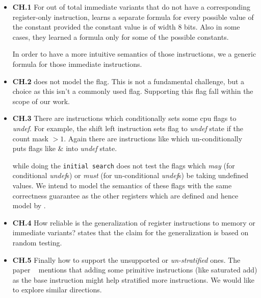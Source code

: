 \begin{itemize}
        
    \item 
    \textbf{CH.1} For \ImmUg{} out of total \ImmTotal{} immediate variants that 
    do not have a corresponding register-only instruction, 
    \Strata  learns a separate formula
    for every possible value of the constant provided the constant value is of
    width 8 bits. Also in some cases, they learned a formula only for some of
    the possible constants.
    
    In order to have a more intuitive semantics of those instructions, we a generic formula for those  immediate instructions.

    \item \textbf{CH.2} \Strata does not model the  flag. This is not a
    fundamental challenge, but a choice as this isn't a commonly used flag.
    Supporting this flag fall within the scope of our work.
      
    \item \textbf{CH.3} There are instructions which conditionally sets some
    cpu flags to \emph{undef}. For example, the shift left instruction
     sets flag  to \emph{undef} state if the
    count mask $>1$.  Again there are instructions like  which un-conditionally puts flags like  \&  into
      \emph{undef} state.
 
    \Strata while doing the {\tt initial search} does not test the flags which
    \emph{may} (for conditional \emph{undef}s)  or \emph{must} (for
        un-conditional \emph{undef}s) be taking undefined values. We intend to
    model the semantics of these flags with the same correctness guarantee as
    the other registers which are defined and hence model by \Strata.
    
    \item \textbf{CH.4} How reliable is the generalization of register
    instructions to memory or immediate variants? \Strata states that the claim
    for the generalization is based on random testing.
    
    \item \textbf{CH.5} Finally how to support the unsupported or
    \emph{un-stratified} ones. The paper ~\cite{Heule2016a} mentions that adding
    some primitive instructions (like saturated add) as the base instruction
    might help stratified more instructions. We would like to explore similar
    directions.   

\end{itemize} 

